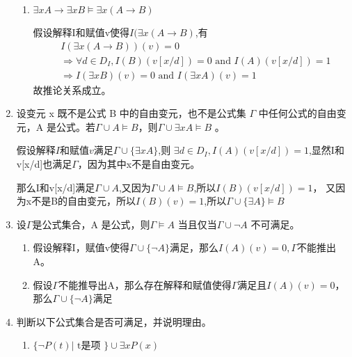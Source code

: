 \documentclass[UTF8]{ctexart}
\begin{document}
\begin{enumerate}
\begin{enumerate}
            \item  $\exists x A \rightarrow  \exists xB \models  \exists x( A \rightarrow  B)$
        
            假设解释I和赋值v使得$I(\exists x(A\rightarrow B)$,有
            \[
                \begin{aligned}
                    &I(\exists x(A\rightarrow B))(v)=0\\
                    &\Rightarrow \forall d\in D_I, I(B)(v[x/d])=0 \text{ and }I(A)(v[x/d])=1\\
                    &\Rightarrow I(\exists xB)(v)=0\text{ and } I(\exists xA)(v)=1
                \end{aligned}
            \]
            故推论关系成立。
        
        \end{enumerate}
        
        \item 设变元 x 既不是公式 B 中的自由变元，也不是公式集 $\Gamma$ 中任何公式的自由变元，A 是公式。若$ \Gamma \cup {A} \models  B $，则$\Gamma  \cup {\exists x A} \models  B$ 。

        假设解释$I$和赋值$v$满足$\Gamma\cup \{\exists xA\}$,则
        $\exists d\in D_I,I(A)(v[x/d])=1$,显然I和v[x/d]也满足$\Gamma$，因为其中x不是自由变元。

        那么I和v[x/d]满足$\Gamma \cup A$,又因为$\Gamma \cup {A} \models  B$,所以$I(B)(v[x/d])=1$，
        又因为x不是B的自由变元，所以$I(B)(v)=1$,所以$\Gamma \cup \{\exists A\}\models B$

        \item 设$\Gamma  $是公式集合，A 是公式，则$\Gamma  \models  A$ 当且仅$当\Gamma  \cup {\neg  A}$ 不可满足。

        \begin{enumerate}
            \item 假设解释I，赋值v使得$\Gamma \cup \{\neg A\}$满足，那么$I(A)(v)=0,\Gamma$不能推出A。
            \item 假设$\Gamma $不能推导出A，那么存在解释和赋值使得$\Gamma $满足且$I(A)(v)=0$，那么$\Gamma \cup \{\neg A\}$满足
        \end{enumerate}

        \item 判断以下公式集合是否可满足，并说明理由。
        \begin{enumerate}
            \item $\{\neg P(t) | \text{ t是项 }\}\cup {\exists xP(x)}$
            

\end{enumerate}
\end{enumerate}
\end{document}
